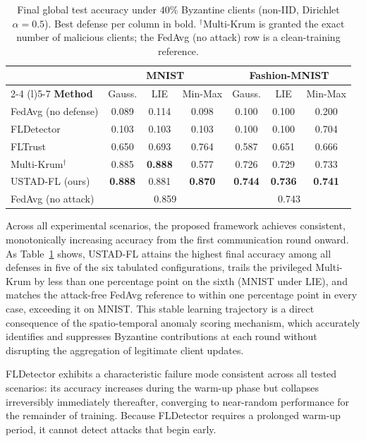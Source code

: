 \documentclass[journal]{IEEEtran}
\begin{document}
\begin{table}[t]
\centering
\caption{Final global test accuracy under $40\%$ Byzantine clients (non-IID, Dirichlet $\alpha=0.5$). Best defense per column in bold. $^\dagger$Multi-Krum is granted the exact number of malicious clients; the FedAvg (no attack) row is a clean-training reference.}
\label{tab:main_results}
\footnotesize
\setlength{\tabcolsep}{3pt}
\begin{tabular}{@{}lcccccc@{}}
\toprule
& \multicolumn{3}{c}{\textbf{MNIST}} & \multicolumn{3}{c}{\textbf{Fashion-MNIST}} \\
\cmidrule(lr){2-4} \cmidrule(l){5-7}
\textbf{Method} & Gauss. & LIE & Min-Max & Gauss. & LIE & Min-Max \\
\midrule
FedAvg (no defense) & 0.089 & 0.114 & 0.098 & 0.100 & 0.100 & 0.200 \\
FLDetector & 0.103 & 0.103 & 0.103 & 0.100 & 0.100 & 0.704 \\
FLTrust & 0.650 & 0.693 & 0.764 & 0.587 & 0.651 & 0.666 \\
Multi-Krum$^\dagger$ & 0.885 & \textbf{0.888} & 0.577 & 0.726 & 0.729 & 0.733 \\
USTAD-FL (ours) & \textbf{0.888} & 0.881 & \textbf{0.870} & \textbf{0.744} & \textbf{0.736} & \textbf{0.741} \\
\midrule
FedAvg (no attack) & \multicolumn{3}{c}{0.859} & \multicolumn{3}{c}{0.743} \\
\bottomrule
\end{tabular}
\end{table}

Across all experimental scenarios, the proposed framework achieves consistent, monotonically increasing accuracy from the first communication round onward. As Table~\ref{tab:main_results} shows, USTAD-FL attains the highest final accuracy among all defenses in five of the six tabulated configurations, trails the privileged Multi-Krum by less than one percentage point on the sixth (MNIST under LIE), and matches the attack-free FedAvg reference to within one percentage point in every case, exceeding it on MNIST. This stable learning trajectory is a direct consequence of the spatio-temporal anomaly scoring mechanism, which accurately identifies and suppresses Byzantine contributions at each round without disrupting the aggregation of legitimate client updates.

FLDetector exhibits a characteristic failure mode consistent across all tested scenarios: its accuracy increases during the warm-up phase but collapses irreversibly immediately thereafter, converging to near-random performance for the remainder of training. Because FLDetector requires a prolonged warm-up period, it cannot detect attacks that begin early.
\end{document}
